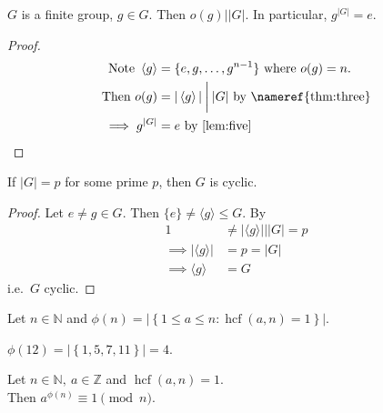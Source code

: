 \begin{corollary}
\protect\hypertarget{cor:two}{}\label{cor:two}
$G$ is a finite group, $g \in G$.
Then $o(g) \mathbin{\bigg|} |G|$.
In particular, $g^{|G|} = e$.
\end{corollary}

\begin{proof}
\begin{align*}
    \text{Note } \left\langle g\right\rangle &= \{ e, g, \dots, g^{n-1} \} \text{ where } o(g) = n. \\
    \text{Then } o(g) &= |\left\langle g\right\rangle| \mathbin{\bigg|} |G| \text{ by \nameref{thm:three}} \\
    \implies g^{|G|} &= e \text{ by \Cref{lem:five}}
\end{align*}
\end{proof}

\begin{corollary}
\protect\hypertarget{cor:three}{}\label{cor:three}
If $|G| = p$ for some prime $p$, then $G$ is cyclic.
\end{corollary}

\begin{proof}
Let $e \neq g \in G$.
Then $\{ e \} \neq \langle g \rangle \leq G$.
By 
\begin{align*}
    1 &\neq |\langle g \rangle| \mathbin{\bigg|} |G| = p \\
    \implies | \langle g \rangle | &= p = |G| \\
    \implies \langle g \rangle &= G
\end{align*}
i.e.~$G$ cyclic.
\end{proof}

\begin{definition}
    Let $n \in \mathbb{N}$ and $\phi(n) = \left| \left\{ 1 \leq a \leq n : \operatorname{hcf}(a, n) = 1 \right\} \right|$.
\end{definition}

\begin{example}
    $\phi(12) = \left| \left\{ 1, 5, 7, 11 \right\} \right| = 4$.
\end{example}

\begin{theorem}
\protect\hypertarget{thm:four}{}\label{thm:four}Let $n \in \mathbb{N},\ a \in \mathbb{Z}$ and $\operatorname{hcf}(a, n) = 1$.\\
Then $a^{\phi(n)} \equiv 1 \pmod n$.
\end{theorem}

